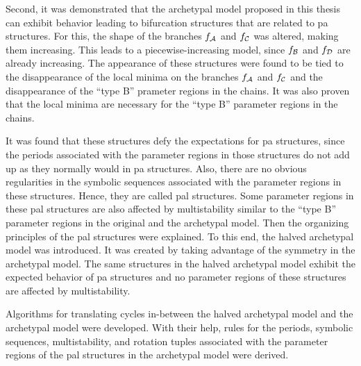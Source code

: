 \clearpage

Second, it was demonstrated that the archetypal model proposed in this thesis can exhibit behavior leading to bifurcation structures that are related to \gls{pa} structures.
For this, the shape of the branches $f_{\mathcal{A}}$ and $f_{\mathcal{C}}$ was altered, making them increasing.
This leads to a piecewise-increasing model, since $f_{\mathcal{B}}$ and $f_{\mathcal{D}}$ are already increasing.
The appearance of these structures were found to be tied to the disappearance of the local minima on the branches $f_{\mathcal{A}}$ and $f_{\mathcal{C}}$ and the disappearance of the ``type B'' prameter regions in the chains.
It was also proven that the local minima are necessary for the ``type B'' parameter regions in the chains.

It was found that these structures defy the expectations for \gls{pa} structures, since the periods associated with the parameter regions in those structures do not add up as they normally would in \gls{pa} structures.
Also, there are no obvious regularities in the symbolic sequences associated with the parameter regions in these structures.
Hence, they are called \gls{pal} structures.
Some parameter regions in these \gls{pal} structures are also affected by multistability similar to the ``type B'' parameter regions in the original and the archetypal model.
Then the organizing principles of the \gls{pal} structures were explained.
To this end, the halved archetypal model was introduced.
It was created by taking advantage of the symmetry in the archetypal model.
The same structures in the halved archetypal model exhibit the expected behavior of \gls{pa} structures and no parameter regions of these structures are affected by multistability.

Algorithms for translating cycles in-between the halved archetypal model and the archetypal model were developed.
With their help, rules for the periods, symbolic sequences, multistability, and rotation tuples associated with the parameter regions of the \gls{pal} structures in the archetypal model were derived.
